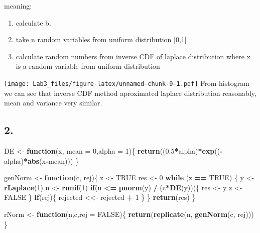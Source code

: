 \documentclass[
]{article}
\newenvironment{Shaded}{\begin{snugshade}}{\end{snugshade}}
\newcommand{\ControlFlowTok}[1]{\textcolor[rgb]{0.13,0.29,0.53}{\textbf{#1}}}
\newcommand{\DataTypeTok}[1]{\textcolor[rgb]{0.13,0.29,0.53}{#1}}
\newcommand{\DecValTok}[1]{\textcolor[rgb]{0.00,0.00,0.81}{#1}}
\newcommand{\FloatTok}[1]{\textcolor[rgb]{0.00,0.00,0.81}{#1}}
\newcommand{\KeywordTok}[1]{\textcolor[rgb]{0.13,0.29,0.53}{\textbf{#1}}}
\newcommand{\NormalTok}[1]{#1}
\newcommand{\OperatorTok}[1]{\textcolor[rgb]{0.81,0.36,0.00}{\textbf{#1}}}
\newcommand{\OtherTok}[1]{\textcolor[rgb]{0.56,0.35,0.01}{#1}}
\newcommand{\StringTok}[1]{\textcolor[rgb]{0.31,0.60,0.02}{#1}}
\providecommand{\tightlist}{%
  \setlength{\itemsep}{0pt}\setlength{\parskip}{0pt}}
\begin{document}
meaning:

\begin{enumerate}
\def\labelenumi{\arabic{enumi}.}
\tightlist
\item
  calculate b.
\item
  take n random variables from uniform distribution {[}0,1{]}
\item
  calculate random numbers from inverse CDF of laplace distribution
  where x is a random variable from uniform distribution
\end{enumerate}

\texttt{[image: Lab3\_files/figure-latex/unnamed-chunk-9-1.pdf]} From
histogram we can see that inverse CDF method aproximated laplace
distribution reasonably, mean and variance very similar.

\hypertarget{section-4}{%
\subsection{2.}\label{section-4}}

\begin{Shaded}
\begin{Highlighting}[]
\NormalTok{DE <-}\StringTok{ }\ControlFlowTok{function}\NormalTok{(x, }\DataTypeTok{mean =} \DecValTok{0}\NormalTok{,}\DataTypeTok{alpha =} \DecValTok{1}\NormalTok{)\{}
  \KeywordTok{return}\NormalTok{((}\FloatTok{0.5}\OperatorTok{*}\NormalTok{alpha)}\OperatorTok{*}\KeywordTok{exp}\NormalTok{((}\OperatorTok{-}\NormalTok{alpha)}\OperatorTok{*}\KeywordTok{abs}\NormalTok{(x}\OperatorTok{-}\NormalTok{mean)))}
\NormalTok{\}}

\NormalTok{genNorm <-}\StringTok{ }\ControlFlowTok{function}\NormalTok{(c, rej)\{}
\NormalTok{  z <-}\StringTok{ }\OtherTok{TRUE}
\NormalTok{  res <-}\StringTok{ }\DecValTok{0}
  \ControlFlowTok{while}\NormalTok{ (z }\OperatorTok{==}\StringTok{ }\OtherTok{TRUE}\NormalTok{) \{}
\NormalTok{    y <-}\StringTok{ }\KeywordTok{rLaplace}\NormalTok{(}\DecValTok{1}\NormalTok{)}
\NormalTok{    u <-}\StringTok{ }\KeywordTok{runif}\NormalTok{(}\DecValTok{1}\NormalTok{)}
    \ControlFlowTok{if}\NormalTok{(u }\OperatorTok{<=}\StringTok{ }\KeywordTok{pnorm}\NormalTok{(y) }\OperatorTok{/}\StringTok{ }\NormalTok{(c}\OperatorTok{*}\KeywordTok{DE}\NormalTok{(y)))\{}
\NormalTok{      res <-}\StringTok{ }\NormalTok{y}
\NormalTok{      z <-}\StringTok{ }\OtherTok{FALSE}    
\NormalTok{    \}}
    \ControlFlowTok{if}\NormalTok{(rej)\{}
\NormalTok{    rejected <<-}\StringTok{ }\NormalTok{rejected }\OperatorTok{+}\StringTok{ }\DecValTok{1}
\NormalTok{    \}}
\NormalTok{  \}}
  \KeywordTok{return}\NormalTok{(res)}
\NormalTok{\}}
  
\NormalTok{rNorm <-}\StringTok{ }\ControlFlowTok{function}\NormalTok{(n,c,}\DataTypeTok{rej =} \OtherTok{FALSE}\NormalTok{)\{}
 \KeywordTok{return}\NormalTok{(}\KeywordTok{replicate}\NormalTok{(n, }\KeywordTok{genNorm}\NormalTok{(c, rej)))}
\NormalTok{\}}
\end{Highlighting}
\end{Shaded}
\end{document}
